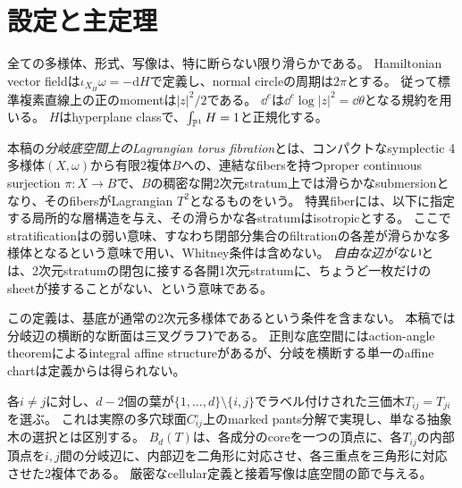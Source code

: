 \section{設定と主定理}\label{sec:main}

全ての多様体、形式、写像は、特に断らない限り滑らかである。
Hamiltonian vector fieldは$\iota_{X_H}\omega=-\mathrm dH$で定義し、normal circleの周期は$2\pi$とする。
従って標準複素直線上の正のmomentは$|z|^2/2$である。
$\dd^c$は$\dd^c\log|z|^2=\dd\theta$となる規約を用いる。
$H$はhyperplane classで、$\int_{\mathbb P^1}H=1$と正規化する。

\begin{definition}\label{def:fibration}
本稿の\emph{分岐底空間上のLagrangian torus fibration}とは、コンパクトなsymplectic 4多様体$(X,\omega)$から有限2複体$B$への、連結なfibersを持つproper continuous surjection $\pi:X\to B$で、$B$の稠密な開2次元stratum上では滑らかなsubmersionとなり、そのfibersがLagrangian $T^2$となるものをいう。
特異fiberには、以下に指定する局所的な層構造を与え、その滑らかな各stratumはisotropicとする。
ここでstratificationは\cite[Definition 2.1]{EM}の弱い意味、すなわち閉部分集合のfiltrationの各差が滑らかな多様体となるという意味で用い、Whitney条件は含めない。
\emph{自由な辺がない}とは、2次元stratumの閉包に接する各開1次元stratumに、ちょうど一枚だけのsheetが接することがない、という意味である。
\end{definition}

この定義は、基底が通常の2次元多様体であるという条件を含まない。
本稿では分岐辺の横断的な断面は三叉グラフ$Y$である。
正則な底空間にはaction-angle theoremによるintegral affine structureがあるが、分岐を横断する単一のaffine chartは定義からは得られない。

各$i\ne j$に対し、$d-2$個の葉が$\{1,\ldots,d\}\setminus\{i,j\}$でラベル付けされた三価木$T_{ij}=T_{ji}$を選ぶ。
これは実際の多穴球面$C_{ij}^{\circ}$上のmarked pants分解で実現し、単なる抽象木の選択とは区別する。
$B_d(T)$は、各成分のcoreを一つの頂点に、各$T_{ij}$の内部頂点を$i,j$間の分岐辺に、内部辺を二角形に対応させ、各三重点を三角形に対応させた2複体である。
厳密なcellular定義と接着写像は底空間の節で与える。

